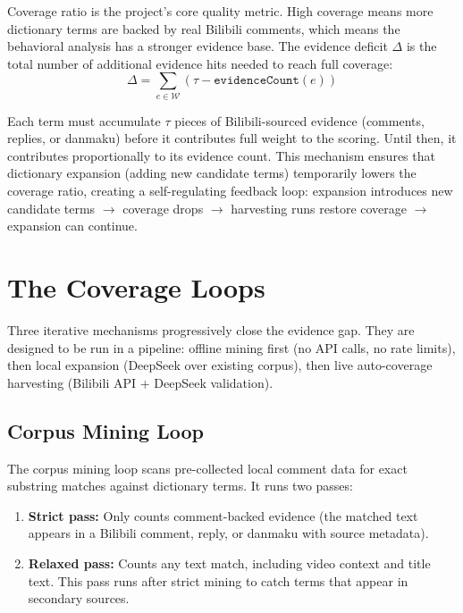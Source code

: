 \documentclass[11pt,a4paper]{article}
\begin{document}
Coverage ratio is the project's core quality metric. High coverage means more
dictionary terms are backed by real Bilibili comments, which means the behavioral
analysis has a stronger evidence base. The evidence deficit $\Delta$ is the total
number of additional evidence hits needed to reach full coverage:
\begin{equation}
  \Delta = \sum_{e \in \mathcal{W}} (\tau - \texttt{evidenceCount}(e))
  \label{eq:deficit}
\end{equation}

Each term must accumulate $\tau$ pieces of Bilibili-sourced evidence
(comments, replies, or danmaku) before it contributes full weight to the scoring.
Until then, it contributes proportionally to its evidence count. This mechanism
ensures that dictionary expansion (adding new candidate terms) temporarily lowers
the coverage ratio, creating a self-regulating feedback loop: expansion introduces
new candidate terms $\rightarrow$ coverage drops $\rightarrow$ harvesting runs
restore coverage $\rightarrow$ expansion can continue.


\section{The Coverage Loops}

Three iterative mechanisms progressively close the evidence gap. They are
designed to be run in a pipeline: offline mining first (no API calls, no rate
limits), then local expansion (DeepSeek over existing corpus), then live
auto-coverage harvesting (Bilibili API + DeepSeek validation).

\subsection{Corpus Mining Loop}

The corpus mining loop scans pre-collected local comment data for exact substring
matches against dictionary terms. It runs two passes:

\begin{enumerate}
  \item \textbf{Strict pass:} Only counts comment-backed evidence (the matched
    text appears in a Bilibili comment, reply, or danmaku with source metadata).
  \item \textbf{Relaxed pass:} Counts any text match, including video context and
    title text. This pass runs after strict mining to catch terms that appear in
    secondary sources.
\end{enumerate}
\end{document}
